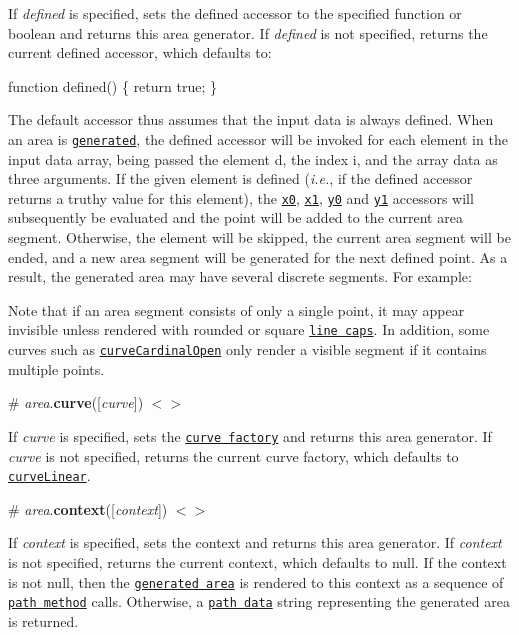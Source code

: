 If {\itshape defined} is specified, sets the defined accessor to the specified function or boolean and returns this area generator. If {\itshape defined} is not specified, returns the current defined accessor, which defaults to\+:


\begin{DoxyCode}
function defined() \{
  return true;
\}
\end{DoxyCode}


The default accessor thus assumes that the input data is always defined. When an area is \href{#_area}{\tt generated}, the defined accessor will be invoked for each element in the input data array, being passed the element {\ttfamily d}, the index {\ttfamily i}, and the array {\ttfamily data} as three arguments. If the given element is defined ({\itshape i.\+e.}, if the defined accessor returns a truthy value for this element), the \href{#area_x0}{\tt x0}, \href{#area_x1}{\tt x1}, \href{#area_y0}{\tt y0} and \href{#area_y1}{\tt y1} accessors will subsequently be evaluated and the point will be added to the current area segment. Otherwise, the element will be skipped, the current area segment will be ended, and a new area segment will be generated for the next defined point. As a result, the generated area may have several discrete segments. For example\+:

\href{http://bl.ocks.org/mbostock/3035090}{\tt }

Note that if an area segment consists of only a single point, it may appear invisible unless rendered with rounded or square \href{https://developer.mozilla.org/en-US/docs/Web/SVG/Attribute/stroke-linecap}{\tt line caps}. In addition, some curves such as \href{#curveCardinalOpen}{\tt curve\+Cardinal\+Open} only render a visible segment if it contains multiple points.

\label{_area_curve}%
\# {\itshape area}.{\bfseries curve}(\mbox{[}{\itshape curve}\mbox{]}) \href{https://github.com/d3/d3-shape/blob/master/src/area.js#L100}{\tt $<$$>$}

If {\itshape curve} is specified, sets the \href{#curves}{\tt curve factory} and returns this area generator. If {\itshape curve} is not specified, returns the current curve factory, which defaults to \href{#curveLinear}{\tt curve\+Linear}.

\label{_area_context}%
\# {\itshape area}.{\bfseries context}(\mbox{[}{\itshape context}\mbox{]}) \href{https://github.com/d3/d3-shape/blob/master/src/area.js#L104}{\tt $<$$>$}

If {\itshape context} is specified, sets the context and returns this area generator. If {\itshape context} is not specified, returns the current context, which defaults to null. If the context is not null, then the \href{#_area}{\tt generated area} is rendered to this context as a sequence of \href{http://www.w3.org/TR/2dcontext/#canvaspathmethods}{\tt path method} calls. Otherwise, a \href{http://www.w3.org/TR/SVG/paths.html#PathData}{\tt path data} string representing the generated area is returned.


